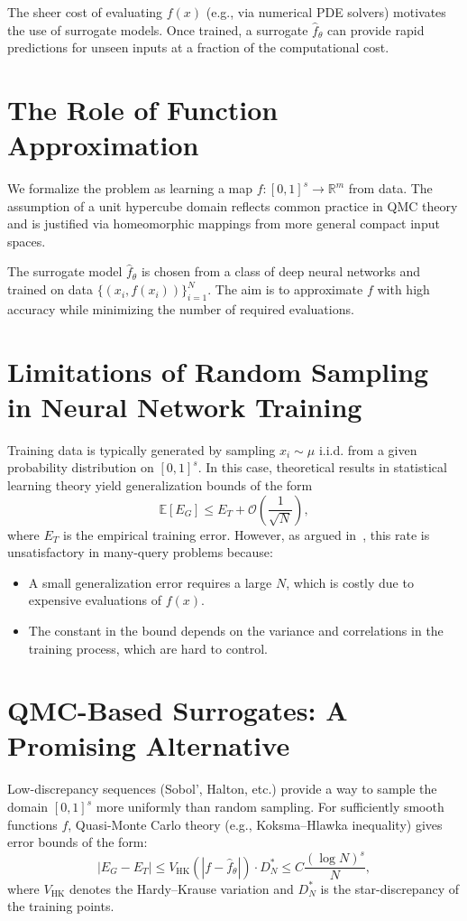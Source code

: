The sheer cost of evaluating $f(x)$ (e.g., via numerical PDE solvers) motivates
the use of surrogate models. Once trained, a surrogate $\hat{f}_\theta$ can
provide rapid predictions for unseen inputs at a fraction of the computational
cost.

\section{The Role of Function Approximation}
We formalize the problem as learning a map $f \colon [0,1]^s \to \mathbb{R}^m$
from data. The assumption of a unit hypercube domain reflects common practice in
QMC theory and is justified via homeomorphic mappings from more general compact
input spaces.

The surrogate model $\hat{f}_\theta$ is chosen from a class of deep neural
networks and trained on data $\{(x_i, f(x_i))\}_{i=1}^N$. The aim is to
approximate $f$ with high accuracy while minimizing the number of required
evaluations.

\section{Limitations of Random Sampling in Neural Network Training}
Training data is typically generated by sampling $x_i \sim \mu$ i.i.d. from a
given probability distribution on $[0,1]^s$. In this case, theoretical results
in statistical learning theory yield generalization bounds of the form
\[
\mathbb{E}[E_G] \leq E_T + \mathcal{O}\left(\frac{1}{\sqrt{N}}\right),
\]
where $E_T$ is the empirical training error. However, as argued
in~\cite{mishra2020enhancing}, this rate is unsatisfactory in many-query
problems because:
\begin{itemize}
  \item A small generalization error requires a large $N$, which is costly due
  to expensive evaluations of $f(x)$.
  \item The constant in the bound depends on the variance and correlations in
  the training process, which are hard to control.
\end{itemize}

\section{QMC-Based Surrogates: A Promising Alternative}
Low-discrepancy sequences (Sobol', Halton, etc.) provide a way to sample the
domain $[0,1]^s$ more uniformly than random sampling. For sufficiently smooth
functions $f$, Quasi-Monte Carlo theory (e.g., Koksma--Hlawka inequality) gives
error bounds of the form:
\[
|E_G - E_T| \leq V_{\mathrm{HK}}(|f - \hat{f}_\theta|) \cdot D^*_N \leq C \frac{(\log N)^s}{N},
\]
where $V_{\mathrm{HK}}$ denotes the Hardy–Krause variation and $D^*_N$ is the
star-discrepancy of the training points.


